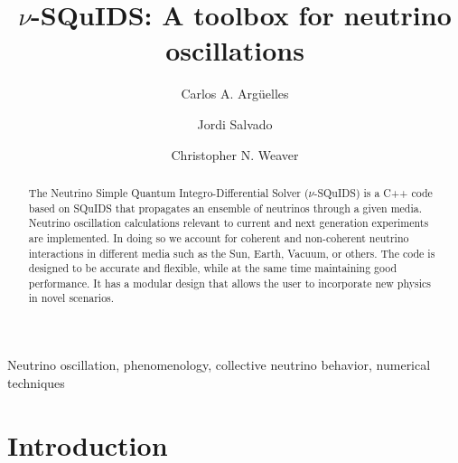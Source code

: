 \documentclass[3p,12pt]{elsarticle}
\begin{document}
\begin{frontmatter}

\title{$\nu$-SQuIDS: A toolbox for neutrino oscillations}

\author[MIT]{Carlos A. Arg\"uelles}
\author[UB]{Jordi Salvado}
\author[UA]{Christopher N. Weaver}
\address[MIT]{Massachusetts Institute of Technology, Cambridge, MA 02139, USA}
\address[UA]{Dept.~of Physics, University of Alberta, Edmonton,
  Alberta, Canada T6G 2E1} 
\address[UB]{Departament de F\'isica Qu\`antica i Astrofísica and Institut de Ciencies del Cosmos,
Universitat de Barcelona, Diagonal 647, E-08028 Barcelona, Spain}


\begin{abstract}
The Neutrino Simple Quantum Integro-Differential Solver ($\nu$-SQuIDS)
is a C++ code based on SQuIDS that propagates an ensemble of neutrinos
through a given media. Neutrino oscillation calculations relevant to
current and next generation experiments are implemented. In doing so
we account for coherent and non-coherent neutrino interactions in
different media such as the Sun, Earth, Vacuum, or others.
The code is designed to be accurate and flexible, while at the
same time maintaining good performance. It has a modular design that
allows the user to incorporate new physics in novel scenarios. 
\end{abstract}

\begin{keyword}
Neutrino oscillation, phenomenology, collective neutrino behavior, numerical techniques
\end{keyword}

\end{frontmatter}

\hypersetup{linkcolor=black}
\tableofcontents
\hypersetup{linkcolor=blue}
\newpage
\section{Introduction}
\label{sec:intro} 
\end{document}
